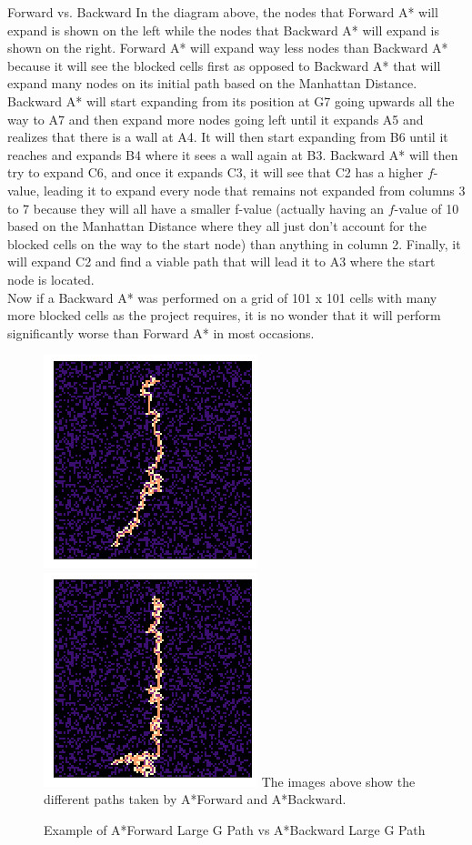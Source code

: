 \documentclass[12pt]{article}
\theoremstyle{definition}
\begin{document}
\begin{onehalfspacing}
\begin{section}{Forward vs. Backward}
In the diagram above, the nodes that Forward A* will expand is shown on the left while the nodes that Backward A* will expand is shown on the right. Forward A* will expand way less nodes than Backward A* because it will see the blocked cells first as opposed to Backward A* that will expand many nodes on its initial path based on the Manhattan Distance. Backward A* will start expanding from its position at G7 going upwards all the way to A7 and then expand more nodes going left until it expands A5 and realizes that there is a wall at A4. It will then start expanding from B6 until it reaches and expands B4 where it sees a wall again at B3. Backward A* will then try to expand C6, and once it expands C3, it will see that  C2 has a higher $f$-value, leading it to expand every node that remains not expanded from columns 3 to 7 because they will all have a smaller f-value (actually having an $f$-value of 10 based on the Manhattan Distance where they all just don't account for the blocked cells on the way to the start node) than anything in column 2. Finally, it will expand C2 and find a viable path that will lead it to A3 where the start node is located.\\[0.5em]
Now if a Backward A* was performed on a grid of 101 x 101 cells with many more blocked cells as the project requires, it is no wonder that it will perform significantly worse than Forward A* in most occasions.

\begin{figure}[h]
\caption{Example of A*Forward Large G Path vs A*Backward Large G Path}
\includegraphics[scale=.8]{images/Forwards1.png}
\includegraphics[scale=.8]{images/Backwards1.png}
The images above show the different paths taken by A*Forward and A*Backward.
\end{figure}


\end{section}
\end{onehalfspacing}
\end{document}
